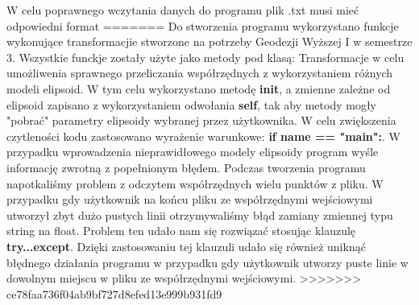\begin{flushleft}
	\hspace{1cm} W celu poprawnego wczytania danych do programu plik .txt musi mieć odpowiedni format
=======
	\hspace{1cm}Do stworzenia programu wykorzystano funkcje wykonujące transformacjie stworzone na potrzeby Geodezji Wyższej I w semestrze 3. Wszystkie funckje zostały użyte jako metody pod klasą: Transformacje w celu umożliwenia sprawnego przeliczania współrzędnych z wykorzystaniem różnych modeli elipsoid. W tym celu wykorzystano metodę \textbf{init}, a zmienne zależne od elipsoid zapisano z wykorzystaniem odwołania \textbf{self}, tak aby metody mogły "pobrać" parametry elipsoidy wybranej przez użytkownika. W celu zwiększenia czytleności kodu zastosowano wyrażenie warunkowe: \textbf{if name == "main":}. W przypadku wprowadzenia nieprawidłowego modely elipsoidy program wyśle informację zwrotną z popełnionym błędem.
	\newline
	\hspace{1cm}Podczas tworzenia programu napotkaliśmy problem z odczytem współrzędnych wielu punktów z pliku. W przypadku gdy użytkownik na końcu pliku ze współrzędnymi wejściowymi utworzył zbyt dużo pustych linii otrzymywaliśmy błąd zamiany zmiennej typu string na float. Problem ten udało nam się rozwiązać stosując klauzulę \textbf{try...except}. Dzięki zastosowaniu tej klauzuli udało się również uniknąć błędnego działania programu w przypadku gdy użytkownik utworzy puste linie w dowolnym miejscu w pliku ze współrzędnymi wejściowymi.
>>>>>>> ce78faa736f04ab9bf727d8efed13e999b931fd9
\end{flushleft}